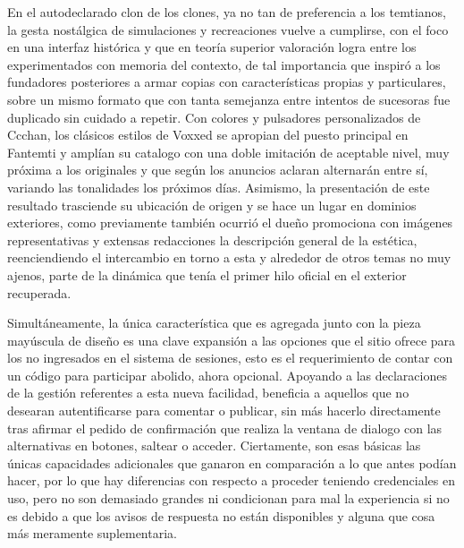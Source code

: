 \documentclass[
]{book}
\begin{document}
En el autodeclarado clon de los clones, ya no tan de preferencia a los temtianos, la gesta nostálgica de simulaciones y recreaciones vuelve a cumplirse, con el foco en una interfaz histórica y que en teoría superior valoración logra entre los experimentados con memoria del contexto, de tal importancia que inspiró a los fundadores posteriores a armar copias con características propias y particulares, sobre un mismo formato que con tanta semejanza entre intentos de sucesoras fue duplicado sin cuidado a repetir. Con colores y pulsadores personalizados de Ccchan, los clásicos estilos de Voxxed se apropian del puesto principal en Fantemti y amplían su catalogo con una doble imitación de aceptable nivel, muy próxima a los originales y que según los anuncios aclaran alternarán entre sí, variando las tonalidades los próximos días. Asimismo, la presentación de este resultado trasciende su ubicación de origen y se hace un lugar en dominios exteriores, como previamente también ocurrió el dueño promociona con imágenes representativas y extensas redacciones la descripción general de la estética, reenciendiendo el intercambio en torno a esta y alrededor de otros temas no muy ajenos, parte de la dinámica que tenía el primer hilo oficial en el exterior recuperada.

Simultáneamente, la única característica que es agregada junto con la pieza mayúscula de diseño es una clave expansión a las opciones que el sitio ofrece para los no ingresados en el sistema de sesiones, esto es el requerimiento de contar con un código para participar abolido, ahora opcional. Apoyando a las declaraciones de la gestión referentes a esta nueva facilidad, beneficia a aquellos que no desearan autentificarse para comentar o publicar, sin más hacerlo directamente tras afirmar el pedido de confirmación que realiza la ventana de dialogo con las alternativas en botones, saltear o acceder. Ciertamente, son esas básicas las únicas capacidades adicionales que ganaron en comparación a lo que antes podían hacer, por lo que hay diferencias con respecto a proceder teniendo credenciales en uso, pero no son demasiado grandes ni condicionan para mal la experiencia si no es debido a que los avisos de respuesta no están disponibles y alguna que cosa más meramente suplementaria.
\end{document}

